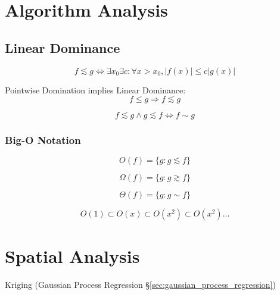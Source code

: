 \section{Algorithm Analysis}\label{sec:algorithm_analysis}

\subsection{Linear Dominance}\label{sec:linear_dominance}

\[
    f \lesssim g \Leftrightarrow
    \exists x_0 \exists c : \forall x > x_0, |f(x)| \leq c |g(x)|
\]

Pointwise Domination implies Linear Dominance:
\[
    f \leq g \Rightarrow f \lesssim g
\]

\[
    f \lesssim g \wedge g \lesssim f \Leftrightarrow f \sim g
\]



\subsubsection{Big-O Notation}\label{sec:bigo_notation}

\[
    O(f) = \{ g : g \lesssim f \}
\]

\[
    \Omega(f) = \{ g : g \gtrsim f \}
\]

\[
    \Theta(f) = \{ g : g \sim f \}
\]

\[
    O(1) \subset O(x) \subset O(x^2) \subset O(x^2) \ldots
\]



\section{Spatial Analysis}\label{sec:spatial_analysis}


Kriging (Gaussian Process Regression \S\ref{sec:gaussian_process_regression})



